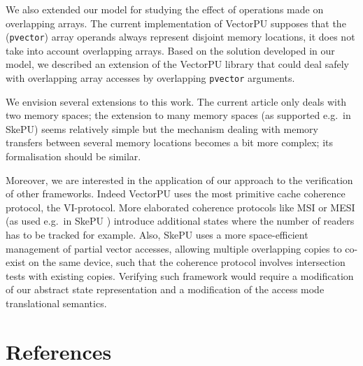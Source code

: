 \documentclass[preprint,12pt]{elsarticle}
\begin{document}
We also extended our model for studying the effect of
operations made on overlapping arrays.
The current implementation of VectorPU supposes that the 
(\texttt{pvector}) array operands always
represent disjoint memory locations, it does not 
take into account overlapping arrays. 
Based on the solution developed in our model,
we described an extension of the VectorPU library that could 
deal safely with overlapping array accesses by
overlapping \texttt{pvector} arguments.

We envision several extensions to this work.
The current article only deals with two memory spaces; the extension to many 
memory spaces (as supported e.g.\ in SkePU)
seems relatively simple but  the mechanism dealing 
with memory transfers between several memory locations becomes a bit more complex; its 
formalisation should be similar.

Moreover, we are interested in the application of our approach to the 
verification of other frameworks. 
Indeed VectorPU uses the most primitive
cache coherence protocol, the VI-protocol.
 More elaborated coherence protocols like MSI or MESI 
 (as used e.g.\ in SkePU \cite{Dastgeer-IJPP15}) 
 introduce additional states where the
 number of readers has to be tracked for example. 
 Also, SkePU uses a more space-efficient management of
 partial vector accesses, allowing multiple overlapping
 copies to co-exist on the same device, such that the
 coherence protocol involves intersection tests with
 existing copies. 
 Verifying such framework would require 
 a modification of our abstract state representation and a modification of the access 
 mode translational semantics.
\section*{References}
 

\end{document}
